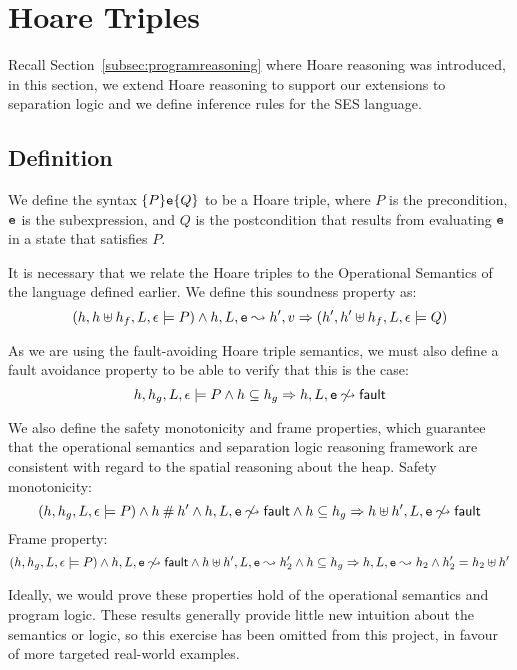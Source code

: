 \documentclass[a4paper,notitlepage]{report}
\begin{document}

\section{Hoare Triples}
Recall Section~\ref{subsec:programreasoning} where Hoare reasoning was introduced, in
this section, we extend Hoare reasoning to support our extensions to
separation logic and we define inference rules for the SES language.  

\subsection{Definition}
We define the syntax $\{P\}\mathtt{e}\{Q\}$ to be a Hoare triple, where $P$ is the
precondition, $\mathtt{e}$ is the subexpression, and $Q$ is the
postcondition that results from evaluating $\mathtt{e}$ in a state that satisfies $P$.

It is necessary that we relate the Hoare triples to the Operational Semantics of
the language defined earlier. We define this soundness property as:
\[ (h, h \uplus h_f, L, \epsilon \models P) \land h, L, \mathtt{e} \leadsto h', v
  \Rightarrow (h', h' \uplus h_f, L, \epsilon \models Q) \]

As we are using the fault-avoiding Hoare triple semantics, we must also define a
fault avoidance property to be able to verify that this is the case:
\[ h, h_g, L, \epsilon \models P \land h\subseteq h_g \Rightarrow h, L, \mathtt{e} \not\leadsto {\ensuremath{\mathsf{fault}}} \]

We also define the safety monotonicity and frame properties, which guarantee
that the operational semantics and separation logic reasoning framework are
consistent with regard to the spatial reasoning about the heap.
Safety monotonicity:
\[ (h, h_g, L, \epsilon \models P) \land h \mathbin{\#} h' \land h, L, \mathtt{e} \not\leadsto
  {\ensuremath{\mathsf{fault}}} \land h\subseteq h_g \Rightarrow h \uplus h', L, \mathtt{e} \not\leadsto {\ensuremath{\mathsf{fault}}} \]
Frame property:
\[ (h, h_g, L, \epsilon \models P) \land h, L, \mathtt{e} \not\leadsto {\ensuremath{\mathsf{fault}}} \land
  h \uplus h', L, \mathtt{e} \leadsto h_2' \land h\subseteq h_g\Rightarrow h, L, \mathtt{e} \leadsto h_2 \land
  h_2' = h_2 \uplus h' \]

Ideally, we would prove these properties hold of the operational semantics and
program logic. These results generally provide little new intuition about the
semantics or logic, so this exercise has been omitted from this project, in
favour of more targeted real-world examples.
\end{document}
